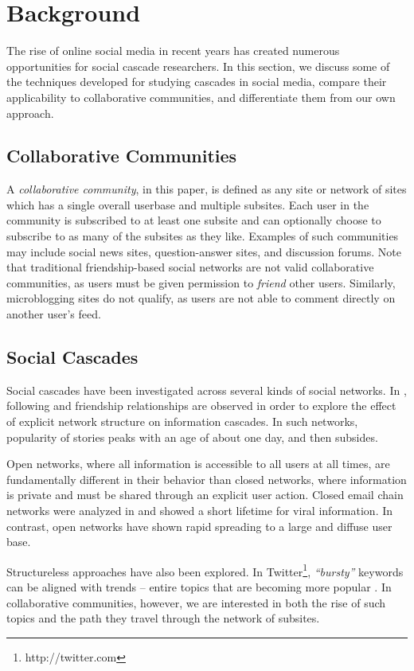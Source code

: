 \documentclass{article} %
\begin{document}
\section{Background}
\label{sec:background}
The rise of online social media in recent years has created numerous opportunities for social cascade researchers. In this section, we discuss some of the techniques developed for studying cascades in social media, compare their applicability to collaborative communities, and differentiate them from our own approach.

\subsection{Collaborative Communities}
A \textit{collaborative community}, in this paper, is defined as any site or network of sites which has a single overall userbase and multiple subsites. Each user in the community is subscribed to at least one subsite and can optionally choose to subscribe to as many of the subsites as they like. Examples of such communities may include social news sites, question-answer sites, and discussion forums. Note that traditional friendship-based social networks are not valid collaborative communities, as users must be given permission to \textit{friend} other users. Similarly, microblogging sites do not qualify, as users are not able to comment directly on another user's feed.

\subsection{Social Cascades}
Social cascades have been investigated across several kinds of social networks. In \cite{info_contag}, following and friendship relationships are observed in order to explore the effect of explicit network structure on information cascades. In such networks, popularity of stories peaks with an age of about one day, and then subsides. 

Open networks, where all information is accessible to all users at all times, are fundamentally different in their behavior than closed networks, where information is private and must be shared through an explicit user action. Closed email chain networks were analyzed in \cite{viral_dynamics} and showed a short lifetime for viral information. In contrast, open networks have shown \cite{flickr} rapid spreading to a large and diffuse user base.

Structureless approaches have also been explored. In Twitter\footnote{http://twitter.com}, \textit{``bursty''} keywords can be aligned with trends -- entire topics that are becoming more popular \cite{twitter_trend}. In collaborative communities, however, we are interested in both the rise of such topics and the path they travel through the network of subsites.
\end{document}
